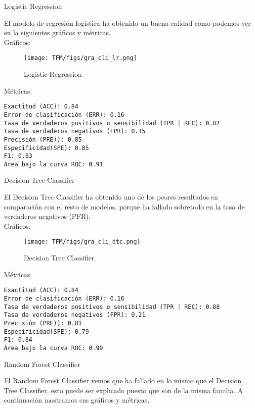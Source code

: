 \begin{itemize}

    \item Logistic Regression

El modelo de regresión logística ha obtenido un buena calidad como podemos ver en la siguientes gráficos y métricas.
\\

Gráficos:    
\begin{figure}[H]
\centerline{\texttt{[image: TFM/figs/gra\_cli\_lr.png]}}
\caption{Logistic Regression}
\label{fig:gra_cli_lr}
\end{figure}
Métricas:
\begin{verbatim}
Exactitud (ACC): 0.84
Error de clasificación (ERR): 0.16
Tasa de verdaderos positivos o sensibilidad (TPR | REC): 0.82
Tasa de verdaderos negativos (FPR): 0.15
Precisión (PRE)): 0.85
Especificidad(SPE): 0.85
F1: 0.83
Área bajo la curva ROC: 0.91
\end{verbatim}

\begin{minipage}{\linewidth}
    \item Decision Tree Classifier

El Decision Tree Classifier ha obtenido uno de los peores resultados en comparación con el resto de modelos, porque ha fallado sobretodo en la tasa de verdaderos negativos (PFR).
\\

Gráficos:
\begin{figure}[H]
\centerline{\texttt{[image: TFM/figs/gra\_cli\_dtc.png]}}
\caption{Decision Tree Classifier}
\label{fig:gra_cli_dtc}
\end{figure}
Métricas:
\begin{verbatim}
Exactitud (ACC): 0.84
Error de clasificación (ERR): 0.16
Tasa de verdaderos positivos o sensibilidad (TPR | REC): 0.88
Tasa de verdaderos negativos (FPR): 0.21
Precisión (PRE)): 0.81
Especificidad(SPE): 0.79
F1: 0.84
Área bajo la curva ROC: 0.90
\end{verbatim}
\end{minipage}

\begin{minipage}{\linewidth}
    \item Random Forest Classifier
    
El Random Forest Classifier vemos que ha fallado en lo mismo que el Decision Tree Classifier, esto puede ser explicado puesto que son de la misma familia. A continuación mostramos sus gráficos y métricas.
\\


\end{minipage}
\end{itemize}
